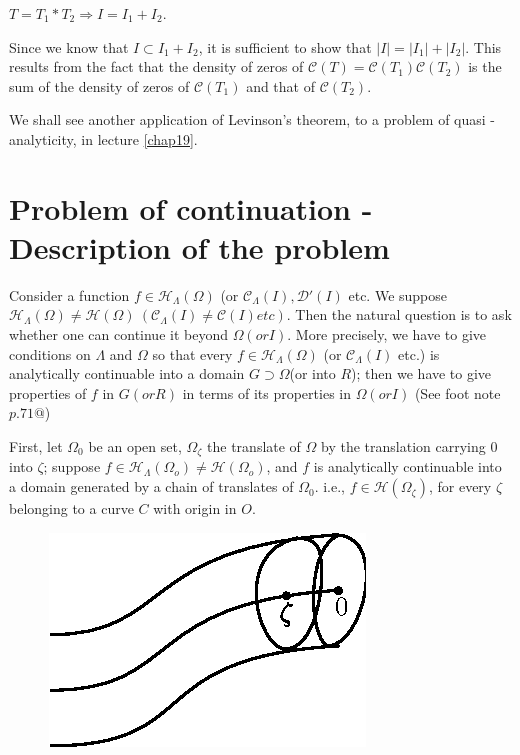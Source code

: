 \begin{theorem*}[on supports] 
  $T = T_1 * T_2 \Rightarrow I = I_1 + I_2$.
\end{theorem*}

Since we know that $I \subset I_1 + I_2 $, it is sufficient to show
that $|I| = |I_1| + |I_2|$. This results from the fact that the density
of zeros of $\mathscr{C}(T) = \mathscr{C}(T_1) \mathscr{C}(T_2)$ is
the sum of the density of zeros of $\mathscr{C}(T_1)$ and that of
$\mathscr{C}(T_2)$. 
 
We shall see another application of Levinson's theorem, to a problem
of quasi - analyticity, in lecture \ref{chap19}. 
 
\section[Problem of continuation - Description of the
  problem]{Problem of continuation - Description of the\hfil\break
  problem}\label{chap12:sec2}%
 
Consider a function $f \in \mathscr{H}_{\Lambda}(\Omega)$ (or
$\mathscr{C}_{\Lambda}(I), \mathscr{D}'(I)$ etc. We suppose
$\mathscr{H}_{\Lambda}(\Omega) \neq \mathscr{H}(\Omega)~
(\mathscr{C}_{\Lambda}(I) \neq \mathscr{C}(I) etc)$. Then the natural
question is to ask whether one can continue it beyond $\Omega(or
I)$. More precisely, we have to give conditions on $\Lambda$ and
$\Omega$ so that every $f \in \mathscr{H}_{\Lambda}(\Omega)$ (or
$\mathscr{C}_{\Lambda}(I)$ etc.) is analytically continuable into a
domain $G \supset \Omega $(or into $R$); then we have to give
properties of $f$ in $G(or R)$ in terms of its properties in $\Omega
(or I)$ (See foot note $p. 71 @$) 
 
\noindent 
\begin{minipage}[c]{5.8cm}
 \quad First, let $\Omega_0$ be an open set, $\Omega_\zeta$ the translate of
$\Omega$ by the translation carrying $0$ into $\zeta$; suppose $f \in
\mathscr{H}_{\Lambda}(\Omega_o) \neq \mathscr{H}(\Omega_o)$, and $f$ is
analytically continuable into a domain generated by a chain of
translates of $\Omega_0$. i.e., $f \in \mathscr{H}(\Omega_{\zeta})$,
for every $\zeta$ belonging to a curve $C$ with origin in $O$. 
\end{minipage}
\begin{minipage}[c]{5cm}
\begin{figure}[H]
\centerline{\includegraphics{vol15-figures/fig15-4.eps}}
\end{figure}
\end{minipage}

